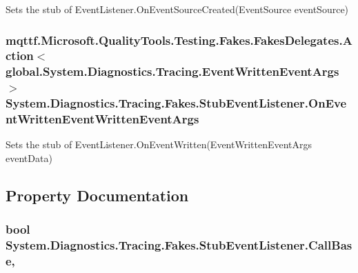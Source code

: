 Sets the stub of Event\-Listener.\-On\-Event\-Source\-Created(\-Event\-Source event\-Source)

\hypertarget{class_system_1_1_diagnostics_1_1_tracing_1_1_fakes_1_1_stub_event_listener_a8977191cdbe3e926ec9325dfc6e41de7}{
\subsubsection[{On\-Event\-Written\-Event\-Written\-Event\-Args}]{\setlength{\rightskip}{0pt plus 5cm}mqttf.\-Microsoft.\-Quality\-Tools.\-Testing.\-Fakes.\-Fakes\-Delegates.\-Action$<$global.\-System.\-Diagnostics.\-Tracing.\-Event\-Written\-Event\-Args$>$ System.\-Diagnostics.\-Tracing.\-Fakes.\-Stub\-Event\-Listener.\-On\-Event\-Written\-Event\-Written\-Event\-Args}}\label{class_system_1_1_diagnostics_1_1_tracing_1_1_fakes_1_1_stub_event_listener_a8977191cdbe3e926ec9325dfc6e41de7}


Sets the stub of Event\-Listener.\-On\-Event\-Written(\-Event\-Written\-Event\-Args event\-Data)



\subsection{Property Documentation}
\hypertarget{class_system_1_1_diagnostics_1_1_tracing_1_1_fakes_1_1_stub_event_listener_a4fdee529565e7276de5e7657c1f6959d}{
\subsubsection[{Call\-Base}]{\setlength{\rightskip}{0pt plus 5cm}bool System.\-Diagnostics.\-Tracing.\-Fakes.\-Stub\-Event\-Listener.\-Call\-Base\hspace{0.3cm}{\ttfamily [get]}, {\ttfamily [set]}}}\label{class_system_1_1_diagnostics_1_1_tracing_1_1_fakes_1_1_stub_event_listener_a4fdee529565e7276de5e7657c1f6959d}


